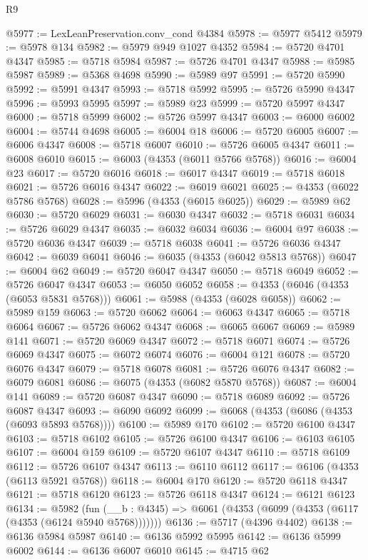 \begin{lexlean}{R9}
\begin{coremodule}
@5977 := LexLeanPreservation.conv_cond @4384
@5978 := @5977 @5412
@5979 := @5978 @134
@5982 := @5979 @949 @1027 @4352
@5984 := @5720 @4701 @4347
@5985 := @5718 @5984
@5987 := @5726 @4701 @4347
@5988 := @5985 @5987
@5989 := @5368 @4698
@5990 := @5989 @97
@5991 := @5720 @5990
@5992 := @5991 @4347
@5993 := @5718 @5992
@5995 := @5726 @5990 @4347
@5996 := @5993 @5995
@5997 := @5989 @23
@5999 := @5720 @5997 @4347
@6000 := @5718 @5999
@6002 := @5726 @5997 @4347
@6003 := @6000 @6002
@6004 := @5744 @4698
@6005 := @6004 @18
@6006 := @5720 @6005
@6007 := @6006 @4347
@6008 := @5718 @6007
@6010 := @5726 @6005 @4347
@6011 := @6008 @6010
@6015 := @6003 (@4353 (@6011 @5766 @5768))
@6016 := @6004 @23
@6017 := @5720 @6016
@6018 := @6017 @4347
@6019 := @5718 @6018
@6021 := @5726 @6016 @4347
@6022 := @6019 @6021
@6025 := @4353 (@6022 @5786 @5768)
@6028 := @5996 (@4353 (@6015 @6025))
@6029 := @5989 @62
@6030 := @5720 @6029
@6031 := @6030 @4347
@6032 := @5718 @6031
@6034 := @5726 @6029 @4347
@6035 := @6032 @6034
@6036 := @6004 @97
@6038 := @5720 @6036 @4347
@6039 := @5718 @6038
@6041 := @5726 @6036 @4347
@6042 := @6039 @6041
@6046 := @6035 (@4353 (@6042 @5813 @5768))
@6047 := @6004 @62
@6049 := @5720 @6047 @4347
@6050 := @5718 @6049
@6052 := @5726 @6047 @4347
@6053 := @6050 @6052
@6058 := @4353 (@6046 (@4353 (@6053 @5831 @5768)))
@6061 := @5988 (@4353 (@6028 @6058))
@6062 := @5989 @159
@6063 := @5720 @6062
@6064 := @6063 @4347
@6065 := @5718 @6064
@6067 := @5726 @6062 @4347
@6068 := @6065 @6067
@6069 := @5989 @141
@6071 := @5720 @6069 @4347
@6072 := @5718 @6071
@6074 := @5726 @6069 @4347
@6075 := @6072 @6074
@6076 := @6004 @121
@6078 := @5720 @6076 @4347
@6079 := @5718 @6078
@6081 := @5726 @6076 @4347
@6082 := @6079 @6081
@6086 := @6075 (@4353 (@6082 @5870 @5768))
@6087 := @6004 @141
@6089 := @5720 @6087 @4347
@6090 := @5718 @6089
@6092 := @5726 @6087 @4347
@6093 := @6090 @6092
@6099 := @6068 (@4353 (@6086 (@4353 (@6093 @5893 @5768))))
@6100 := @5989 @170
@6102 := @5720 @6100 @4347
@6103 := @5718 @6102
@6105 := @5726 @6100 @4347
@6106 := @6103 @6105
@6107 := @6004 @159
@6109 := @5720 @6107 @4347
@6110 := @5718 @6109
@6112 := @5726 @6107 @4347
@6113 := @6110 @6112
@6117 := @6106 (@4353 (@6113 @5921 @5768))
@6118 := @6004 @170
@6120 := @5720 @6118 @4347
@6121 := @5718 @6120
@6123 := @5726 @6118 @4347
@6124 := @6121 @6123
@6134 := @5982
    (fun (__b : @4345) => @6061 (@4353 (@6099 (@4353 (@6117 (@4353 (@6124 @5940 @5768)))))))
@6136 := @5717 (@4396 @4402)
@6138 := @6136 @5984 @5987
@6140 := @6136 @5992 @5995
@6142 := @6136 @5999 @6002
@6144 := @6136 @6007 @6010
@6145 := @4715 @62

\end{coremodule}
\end{lexlean}
